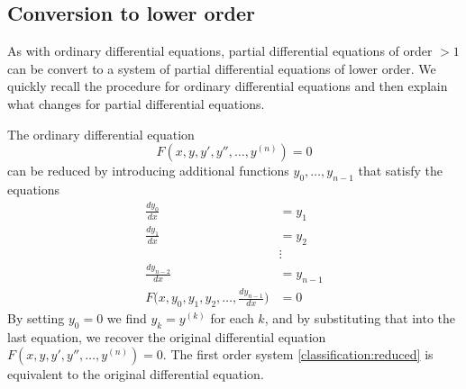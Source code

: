 \subsection{Conversion to lower order\label{klassifikation:umwandlung}}
As with ordinary differential equations, partial differential equations
of order $>1$ can be convert to a system of partial differential equations
of lower order.
We quickly recall the procedure for ordinary differential equations
and then explain what changes for partial differential equations.

The ordinary differential equation
\[
F(x,y,y',y'',\dots,y^{(n)})=0
\]
can be reduced by introducing additional functions 
$y_0,\dots,y_{n-1}$
that satisfy the equations
\begin{equation}
\begin{aligned}
\frac{dy_0}{dx}&=y_1\\
\frac{dy_1}{dx}&=y_2\\
&\vdots\\
\frac{dy_{n-2}}{dx}&=y_{n-1}\\
F\biggl(x,y_0,y_1,y_2,\dots,\frac{dy_{n-1}}{dx}\biggr)&=0
\end{aligned}
\label{classification:reduced}
\end{equation}
By setting $y_0=0$ we find
$y_k=y^{(k)}$ for each $k$, and by substituting that into the last
equation, we recover the original differential equation
$F(x,y,y',y'',\dots,y^{(n)})=0$.
The first order system \eqref{classification:reduced} is equivalent to the
original differential equation.

